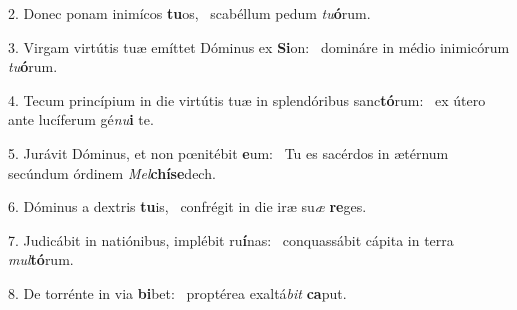 2. Donec ponam inimícos \textbf{tu}os, \ast\  scabéllum pedum \textit{tu}\textbf{ó}rum.\

3. Virgam virtútis tuæ emíttet Dóminus ex \textbf{Si}on: \ast\  domináre in médio inimicórum \textit{tu}\textbf{ó}rum.\

4. Tecum princípium in die virtútis tuæ in splendóribus sanc\textbf{tó}rum: \ast\  ex útero ante lucíferum gé\textit{nu}\textbf{i} te.\

5. Jurávit Dóminus, et non pœnitébit \textbf{e}um: \ast\  Tu es sacérdos in ætérnum secúndum órdinem \textit{Mel}\textbf{chí}\textbf{se}dech.\

6. Dóminus a dextris \textbf{tu}is, \ast\  confrégit in die iræ su\textit{æ} \textbf{re}ges.\

7. Judicábit in natiónibus, implébit ru\textbf{í}nas: \ast\  conquassábit cápita in terra \textit{mul}\textbf{tó}rum.\

8. De torrénte in via \textbf{bi}bet: \ast\  proptérea exaltá\textit{bit} \textbf{ca}put.\

